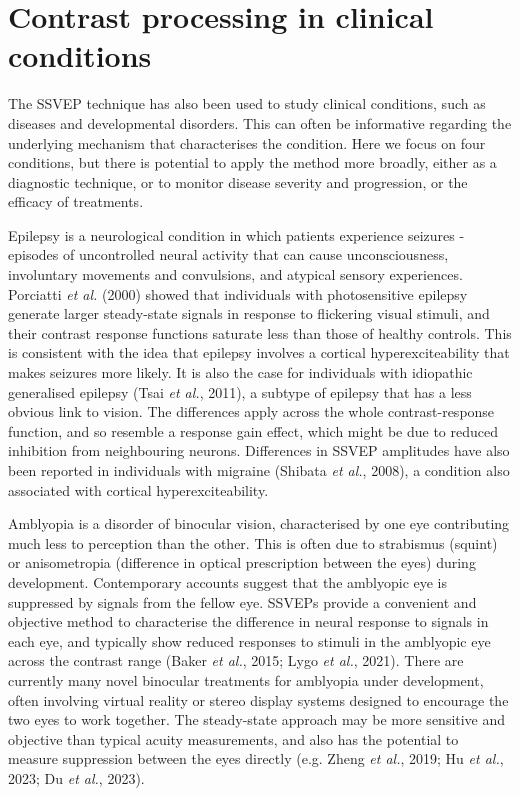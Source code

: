 \documentclass[
  letterpaper,
  DIV=11,
  numbers=noendperiod]{scrartcl}
\begin{document}
\section{Contrast processing in clinical
conditions}\label{contrast-processing-in-clinical-conditions}

The SSVEP technique has also been used to study clinical conditions,
such as diseases and developmental disorders. This can often be
informative regarding the underlying mechanism that characterises the
condition. Here we focus on four conditions, but there is potential to
apply the method more broadly, either as a diagnostic technique, or to
monitor disease severity and progression, or the efficacy of treatments.

Epilepsy is a neurological condition in which patients experience
seizures - episodes of uncontrolled neural activity that can cause
unconsciousness, involuntary movements and convulsions, and atypical
sensory experiences. Porciatti \emph{et al.} (2000) showed that
individuals with photosensitive epilepsy generate larger steady-state
signals in response to flickering visual stimuli, and their contrast
response functions saturate less than those of healthy controls. This is
consistent with the idea that epilepsy involves a cortical
hyperexciteability that makes seizures more likely. It is also the case
for individuals with idiopathic generalised epilepsy (Tsai \emph{et
al.}, 2011), a subtype of epilepsy that has a less obvious link to
vision. The differences apply across the whole contrast-response
function, and so resemble a response gain effect, which might be due to
reduced inhibition from neighbouring neurons. Differences in SSVEP
amplitudes have also been reported in individuals with migraine (Shibata
\emph{et al.}, 2008), a condition also associated with cortical
hyperexciteability.

Amblyopia is a disorder of binocular vision, characterised by one eye
contributing much less to perception than the other. This is often due
to strabismus (squint) or anisometropia (difference in optical
prescription between the eyes) during development. Contemporary accounts
suggest that the amblyopic eye is suppressed by signals from the fellow
eye. SSVEPs provide a convenient and objective method to characterise
the difference in neural response to signals in each eye, and typically
show reduced responses to stimuli in the amblyopic eye across the
contrast range (Baker \emph{et al.}, 2015; Lygo \emph{et al.}, 2021).
There are currently many novel binocular treatments for amblyopia under
development, often involving virtual reality or stereo display systems
designed to encourage the two eyes to work together. The steady-state
approach may be more sensitive and objective than typical acuity
measurements, and also has the potential to measure suppression between
the eyes directly (e.g. Zheng \emph{et al.}, 2019; Hu \emph{et al.},
2023; Du \emph{et al.}, 2023).
\end{document}
